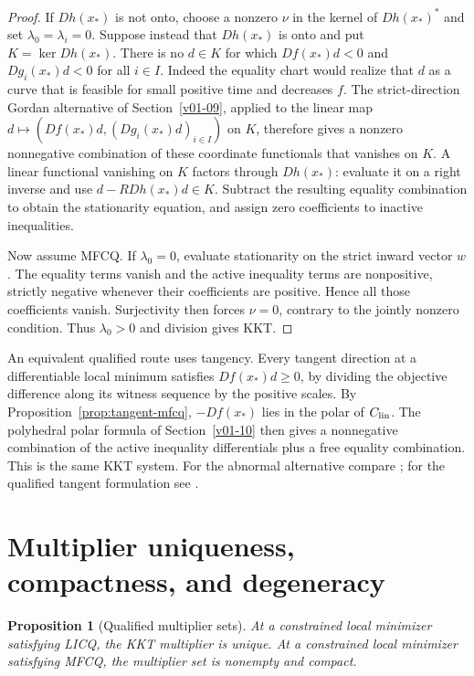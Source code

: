 \documentclass[11pt,oneside,openany]{book}
\theoremstyle{plain}
\newtheorem{proposition}[theorem]{Proposition}
\theoremstyle{definition}
\theoremstyle{remark}
\begin{document}
\begin{proof}
If \(Dh(x_*)\) is not onto, choose a nonzero
\(\nu\) in the kernel of \(Dh(x_*)^*\) and
set \(\lambda_0=\lambda_i=0\).
Suppose instead that \(Dh(x_*)\) is onto and
put \(K=\ker Dh(x_*)\).
There is no \(d\in K\) for which
\(Df(x_*)d<0\) and \(Dg_i(x_*)d<0\) for all
\(i\in I\). Indeed the equality chart would
realize that \(d\) as a curve that is feasible
for small positive time and decreases \(f\).
The strict-direction Gordan alternative of
Section~\ref{v01-09}, applied to the linear map
\(d\mapsto(Df(x_*)d,(Dg_i(x_*)d)_{i\in I})\)
on \(K\), therefore gives a nonzero nonnegative
combination of these coordinate functionals
that vanishes on \(K\). A linear functional
vanishing on \(K\) factors through \(Dh(x_*)\):
evaluate it on a right inverse and use
\(d-RDh(x_*)d\in K\). Subtract the resulting
equality combination to obtain the stationarity
equation, and assign zero coefficients to inactive
inequalities.

Now assume MFCQ. If \(\lambda_0=0\), evaluate
stationarity on the strict inward vector \(w\).
The equality terms vanish and the active
inequality terms are nonpositive, strictly
negative whenever their coefficients are
positive. Hence all those coefficients vanish.
Surjectivity then forces \(\nu=0\), contrary to
the jointly nonzero condition. Thus
\(\lambda_0>0\) and division gives KKT.
\end{proof}

An equivalent qualified route uses tangency.
Every tangent direction at a differentiable
local minimum satisfies \(Df(x_*)d\ge0\), by
dividing the objective difference along its
witness sequence by the positive scales.
By Proposition~\ref{prop:tangent-mfcq},
\(-Df(x_*)\) lies in the polar of \(C_{\rm lin}\).
The polyhedral polar formula of Section~\ref{v01-10}
then gives a nonnegative combination of the
active inequality differentials plus a free
equality combination. This is the same KKT
system. For the abnormal alternative compare
\cite[Sections 2--3]{MangasarianFromovitz};
for the qualified tangent formulation see
\cite[Theorems 12.1 and 12.9]{NocedalWright}.

\section{Multiplier uniqueness, compactness, and degeneracy}
\label{v06-05}

\begin{proposition}[Qualified multiplier sets]\label{prop:qualified-multiplier-sets}
At a constrained local minimizer satisfying LICQ,
the KKT multiplier is unique.
At a constrained local minimizer satisfying MFCQ,
the multiplier set is nonempty and compact.
\end{proposition}
\end{document}
